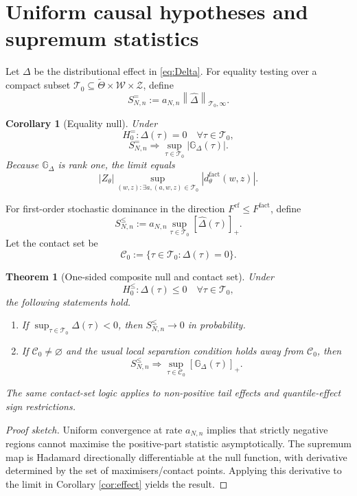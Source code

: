 \documentclass[11pt]{article}
\newtheorem{theorem}[assumption]{Theorem}
\newtheorem{corollary}[assumption]{Corollary}
\theoremstyle{remark}
\newcommand{\cf}{\mathrm{cf}}
\newcommand{\fact}{\mathrm{fact}}
\newcommand{\cW}{\mathcal W}
\newcommand{\cT}{\mathcal T}
\newcommand{\cZ}{\mathcal Z}
\newcommand{\cC}{\mathcal C}
\newcommand{\norm}[1]{\left\lVert #1\right\rVert}
\newcommand{\abs}[1]{\left\lvert #1\right\rvert}
\newcommand{\an}{a_{N,n}}
\begin{document}
\section{Uniform causal hypotheses and supremum statistics}

Let $\Delta$ be the distributional effect in \eqref{eq:Delta}.  For equality testing over a compact subset $\cT_0\subseteq\widetilde\Theta\times\cW\times\cZ$, define
\begin{equation}\label{eq:Sequality}
 S^{=}_{N,n}
 :=\an\norm{\widehat\Delta}_{\cT_0,\infty}.
\end{equation}

\begin{corollary}[Equality null]\label{cor:equality}
Under
\[
 H_0^{=}:\Delta(\tau)=0\quad\forall\tau\in\cT_0,
\]
\[
 S^{=}_{N,n}
 \Rightarrow
 \sup_{\tau\in\cT_0}\abs{\mathbb G_\Delta(\tau)}.
\]
Because $\mathbb G_\Delta$ is rank one, the limit equals
\[
 \abs{Z_\theta}
 \sup_{(w,z):\exists a,(a,w,z)\in\cT_0}
 \abs{d_\theta^{\fact}(w,z)}.
\]
\end{corollary}

For first-order stochastic dominance in the direction $F^{\cf}\le F^{\fact}$, define
\begin{equation}\label{eq:Sineq}
 S^{\le}_{N,n}
 :=\an\sup_{\tau\in\cT_0}[\widehat\Delta(\tau)]_+.
\end{equation}
Let the contact set be
\[
 \cC_0:=\{\tau\in\cT_0:\Delta(\tau)=0\}.
\]

\begin{theorem}[One-sided composite null and contact set]\label{thm:contact}
Under
\[
 H_0^{\le}:\Delta(\tau)\le0\quad\forall\tau\in\cT_0,
\]
the following statements hold.
\begin{enumerate}[label=(\roman*)]
 \item If $\sup_{\tau\in\cT_0}\Delta(\tau)<0$, then $S^{\le}_{N,n}\to0$ in probability.
 \item If $\cC_0\neq\varnothing$ and the usual local separation condition holds away from $\cC_0$, then
 \[
 S^{\le}_{N,n}
 \Rightarrow
 \sup_{\tau\in\cC_0}[\mathbb G_\Delta(\tau)]_+.
 \]
\end{enumerate}
The same contact-set logic applies to non-positive tail effects and quantile-effect sign restrictions.
\end{theorem}

\begin{proof}[Proof sketch]
Uniform convergence at rate $\an$ implies that strictly negative regions cannot maximise the positive-part statistic asymptotically.  The supremum map is Hadamard directionally differentiable at the null function, with derivative determined by the set of maximisers/contact points.  Applying this derivative to the limit in Corollary \ref{cor:effect} yields the result.
\end{proof}
\end{document}
